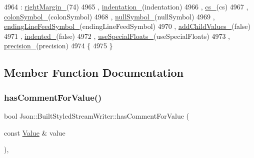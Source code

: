 \begin{DoxyCode}
4964   : \hyperlink{struct_json_1_1_built_styled_stream_writer_a06a51521ccae20397f52fe3036edc602}{rightMargin\_}(74)
4965   , \hyperlink{struct_json_1_1_built_styled_stream_writer_aaa4cbad91428ceca37cbabfc2a17a92d}{indentation\_}(indentation)
4966   , \hyperlink{struct_json_1_1_built_styled_stream_writer_a89a9c76c7531143b52785861ba21c1d4}{cs\_}(cs)
4967   , \hyperlink{struct_json_1_1_built_styled_stream_writer_a9f10991ddef9b77d0b580e24e71483c6}{colonSymbol\_}(colonSymbol)
4968   , \hyperlink{struct_json_1_1_built_styled_stream_writer_a6ccceadf4b1286a519a175cb59cb61d5}{nullSymbol\_}(nullSymbol)
4969   , \hyperlink{struct_json_1_1_built_styled_stream_writer_a5e61a9a4b2af52b98900286c843b86f7}{endingLineFeedSymbol\_}(endingLineFeedSymbol)
4970   , \hyperlink{struct_json_1_1_built_styled_stream_writer_abed9cc31da503b48798e7cea68c42e16}{addChildValues\_}(\textcolor{keyword}{false})
4971   , \hyperlink{struct_json_1_1_built_styled_stream_writer_a6aa0ad023e623f600103631a6bca6d10}{indented\_}(\textcolor{keyword}{false})
4972   , \hyperlink{struct_json_1_1_built_styled_stream_writer_a6f1b8694b4eb17ab8c34f6d6dd8c8a4a}{useSpecialFloats\_}(useSpecialFloats)
4973   , \hyperlink{struct_json_1_1_built_styled_stream_writer_a6373d8d0ae4741b64e3904e4db0eef46}{precision\_}(precision)
4974 \{
4975 \}
\end{DoxyCode}


\subsection{Member Function Documentation}
\mbox{\label{struct_json_1_1_built_styled_stream_writer_a457c2f3c1e8c952caeb60e52477d0c9a}} 
\subsubsection{\texorpdfstring{has\+Comment\+For\+Value()}{hasCommentForValue()}}
{\footnotesize\ttfamily bool Json\+::\+Built\+Styled\+Stream\+Writer\+::has\+Comment\+For\+Value (\begin{DoxyParamCaption}\item[{const \hyperlink{class_json_1_1_value}{Value} \&}]{value }\end{DoxyParamCaption})\hspace{0.3cm}{\ttfamily [static]}, {\ttfamily [private]}}



